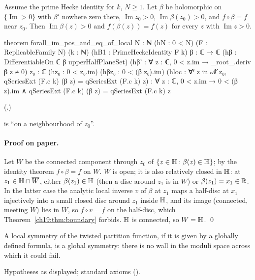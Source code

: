 \begin{theorem}\label{ch19:thm:extension}
Assume the prime Hecke identity for $k$, $N\ge1$.  Let $\beta$ be holomorphic on $\{\operatorname{Im}>0\}$ with $\beta'$ nowhere zero there,
$\operatorname{Im}z_0>0$, $\operatorname{Im}\beta(z_0)>0$, and $f\circ\beta=f$ near $z_0$.  Then $\operatorname{Im}\beta(z)>0$ and $f(\beta(z))=f(z)$ for
every $z$ with $\operatorname{Im}z>0$.
\end{theorem}
\begin{leancode}
theorem forall_im_pos_and_eq_of_local {N : ℕ} (hN : 0 < N) (F : ReplicableFamily N) (k : ℕ)
    (hB1 : PrimeHeckeIdentity F k) {β : ℂ → ℂ} (hβ : DifferentiableOn ℂ β upperHalfPlaneSet)
    (hβ' : ∀ z : ℂ, 0 < z.im → _root_.deriv β z ≠ 0) {z₀ : ℂ} (hz₀ : 0 < z₀.im)
    (hβz₀ : 0 < (β z₀).im)
    (hloc : ∀ᶠ z in 𝓝 z₀, qSeriesExt (F.c k) (β z) = qSeriesExt (F.c k) z) :
    ∀ z : ℂ, 0 < z.im → 0 < (β z).im ∧ qSeriesExt (F.c k) (β z) = qSeriesExt (F.c k) z
\end{leancode}
(.)
\begin{dictionary} is ``on a neighbourhood of $z_0$''.\end{dictionary}
\paragraph{Proof on paper.}  Let $W$ be the connected component through $z_0$ of $\{z\in\mathbb{H}:\beta(z)\in\mathbb{H}\}$; by the identity
theorem $f\circ\beta=f$ on $W$.  $W$ is open; it is also relatively closed in $\mathbb{H}$: at $z_1\in\mathbb{H}\cap\overline W$, either
$\beta(z_1)\in\mathbb{H}$ (then a disc around $z_1$ is in $W$) or $\beta(z_1)=x_1\in\mathbb{R}$.  In the latter case the analytic local inverse $v$
of $\beta$ at $z_1$ maps a half-disc at $x_1$ injectively into a small closed disc around $z_1$ inside $\mathbb{H}$, and its image (connected,
meeting $W$) lies in $W$, so $f\circ v=f$ on the half-disc, which Theorem~\ref{ch19:thm:boundary} forbids.  $\mathbb{H}$ is connected, so
$W=\mathbb{H}$. \qed
\begin{physics}A local symmetry of the twisted partition function, if it is given by a globally defined formula, is a global
symmetry: there is no wall in the moduli space across which it could fail.\end{physics}
\begin{status}Hypotheses as displayed; standard axioms ().\end{status}

